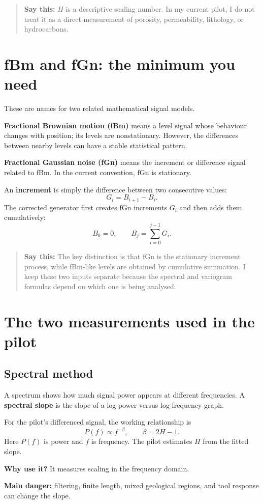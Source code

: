 \documentclass[11pt,a4paper]{article}
\newcommand{\term}[1]{\textbf{\color{Navy}#1}}
\newcommand{\say}[1]{\begin{quote}\color{Navy}\textbf{Say this:} #1\end{quote}}
\begin{document}
\say{$H$ is a descriptive scaling number. In my current pilot, I do not treat it as a direct measurement of porosity, permeability, lithology, or hydrocarbons.}

\section{fBm and fGn: the minimum you need}
These are names for two related mathematical signal models.

\term{Fractional Brownian motion (fBm)} means a level signal whose behaviour changes with position; its levels are nonstationary. However, the differences between nearby levels can have a stable statistical pattern.

\term{Fractional Gaussian noise (fGn)} means the increment or difference signal related to fBm. In the current convention, fGn is stationary.

An \term{increment} is simply the difference between two consecutive values:
\[
G_i=B_{i+1}-B_i.
\]
The corrected generator first creates fGn increments $G_i$ and then adds them cumulatively:
\[
B_0=0,\qquad B_j=\sum_{i=0}^{j-1}G_i.
\]

\say{The key distinction is that fGn is the stationary increment process, while fBm-like levels are obtained by cumulative summation. I keep these two inputs separate because the spectral and variogram formulas depend on which one is being analysed.}

\section{The two measurements used in the pilot}
\subsection{Spectral method}
A spectrum shows how much signal power appears at different frequencies. A \term{spectral slope} is the slope of a log-power versus log-frequency graph.

For the pilot's differenced signal, the working relationship is
\[
P(f)\propto f^{-\beta},\qquad \beta=2H-1.
\]
Here $P(f)$ is power and $f$ is frequency. The pilot estimates $H$ from the fitted slope.

\term{Why use it?} It measures scaling in the frequency domain.

\term{Main danger:} filtering, finite length, mixed geological regions, and tool response can change the slope.
\end{document}
